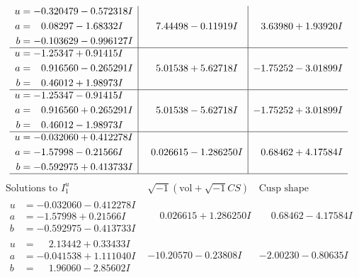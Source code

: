 \documentclass[1p]{elsarticle_modified}
\theoremstyle{definition}
\newcommand{\I}{\sqrt{-1}}
\begin{document}
$$\begin{array}{c|c|c}
\begin{aligned}
u &= -0.320479 - 0.572318 I \\
a &= \phantom{-}0.08297 - 1.68332 I \\
b &= -0.103629 - 0.996127 I\end{aligned}
 & \phantom{-}7.44498 - 0.11919 I & \phantom{-}3.63980 + 1.93920 I \\ \hline\begin{aligned}
u &= -1.25347 + 0.91415 I \\
a &= \phantom{-}0.916560 - 0.265291 I \\
b &= \phantom{-}0.46012 + 1.98973 I\end{aligned}
 & \phantom{-}5.01538 + 5.62718 I & -1.75252 - 3.01899 I \\ \hline\begin{aligned}
u &= -1.25347 - 0.91415 I \\
a &= \phantom{-}0.916560 + 0.265291 I \\
b &= \phantom{-}0.46012 - 1.98973 I\end{aligned}
 & \phantom{-}5.01538 - 5.62718 I & -1.75252 + 3.01899 I \\ \hline\begin{aligned}
u &= -0.032060 + 0.412278 I \\
a &= -1.57998 - 0.21566 I \\
b &= -0.592975 + 0.413733 I\end{aligned}
 & \phantom{-}0.026615 - 1.286250 I & \phantom{-}0.68462 + 4.17584 I\\
 \hline 
 \end{array}$$\newpage$$\begin{array}{c|c|c}  
\text{Solutions to }I^u_{1}& \I (\text{vol} + \sqrt{-1}CS) & \text{Cusp shape}\\
 \hline 
\begin{aligned}
u &= -0.032060 - 0.412278 I \\
a &= -1.57998 + 0.21566 I \\
b &= -0.592975 - 0.413733 I\end{aligned}
 & \phantom{-}0.026615 + 1.286250 I & \phantom{-}0.68462 - 4.17584 I \\ \hline\begin{aligned}
u &= \phantom{-}2.13442 + 0.33433 I \\
a &= -0.041538 + 1.111040 I \\
b &= \phantom{-}1.96060 - 2.85602 I\end{aligned}
 & -10.20570 - 0.23808 I & -2.00230 - 0.80635 I \\ \hline\begin{aligned}

\end{aligned}
\end{array}$$
\end{document}
